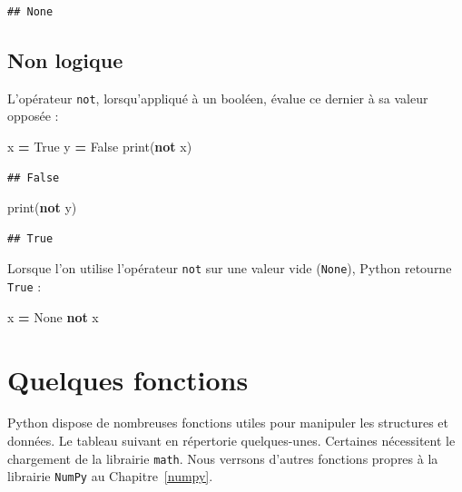 \documentclass[12pt,]{book}
\newenvironment{Shaded}{\begin{snugshade}}{\end{snugshade}}
\newcommand{\KeywordTok}[1]{\textcolor[rgb]{0.13,0.29,0.53}{\textbf{#1}}}
\newcommand{\VariableTok}[1]{\textcolor[rgb]{0.00,0.00,0.00}{#1}}
\newcommand{\OperatorTok}[1]{\textcolor[rgb]{0.81,0.36,0.00}{\textbf{#1}}}
\newcommand{\BuiltInTok}[1]{#1}
\newcommand{\NormalTok}[1]{#1}
\numberwithin{equation}{section}
\numberwithin{countremarque}{section}
\begin{document}
\begin{lstlisting}
## None
\end{lstlisting}

\subsection{Non logique}\label{non-logique}

L'opérateur \texttt{not}, lorsqu'appliqué à un booléen, évalue ce
dernier à sa valeur opposée :

\begin{Shaded}
\begin{Highlighting}[]
\NormalTok{x }\OperatorTok{=} \VariableTok{True}
\NormalTok{y }\OperatorTok{=} \VariableTok{False}
\BuiltInTok{print}\NormalTok{(}\KeywordTok{not}\NormalTok{ x)}
\end{Highlighting}
\end{Shaded}

\begin{lstlisting}
## False
\end{lstlisting}

\begin{Shaded}
\begin{Highlighting}[]
\BuiltInTok{print}\NormalTok{(}\KeywordTok{not}\NormalTok{ y)}
\end{Highlighting}
\end{Shaded}

\begin{lstlisting}
## True
\end{lstlisting}

Lorsque l'on utilise l'opérateur \texttt{not} sur une valeur vide
(\texttt{None}), Python retourne \texttt{True} :

\begin{Shaded}
\begin{Highlighting}[]
\NormalTok{x }\OperatorTok{=} \VariableTok{None}
\KeywordTok{not}\NormalTok{ x}
\end{Highlighting}
\end{Shaded}

\section{Quelques fonctions}\label{quelques-fonctions}

Python dispose de nombreuses fonctions utiles pour manipuler les
structures et données. Le tableau suivant en répertorie quelques-unes.
Certaines nécessitent le chargement de la librairie \texttt{math}. Nous
verrsons d'autres fonctions propres à la librairie \texttt{NumPy} au
Chapitre~\ref{numpy}.
\end{document}
